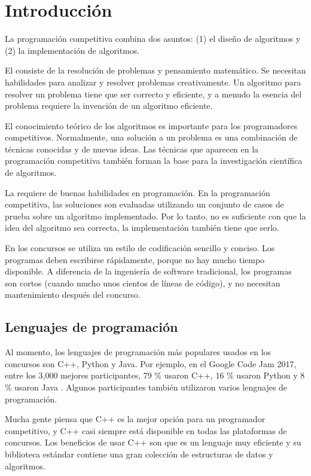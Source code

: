 \chapter{Introducción}

La programación competitiva combina dos asuntos:
(1) el diseño de algoritmos y (2) la implementación de algoritmos.

El  consiste de la resolución de problemas
y pensamiento matemático.
Se necesitan habilidades para analizar y resolver problemas creativamente.
Un algoritmo para resolver un problema
tiene que ser correcto y eficiente,
y a menudo la esencia del problema requiere
la invención de un algoritmo eficiente.

El conocimiento teórico de los algoritmos
es importante para los programadores competitivos.
Normalmente, una solución a un problema es
una combinación de técnicas conocidas y de
nuevas ideas. 
Las técnicas que aparecen en la programación competitiva
también forman la base para la investigación científica
de algoritmos.

La  requiere de buenas
habilidades en programación.
En la programación competitiva, las soluciones
son evaluadas utilizando un conjunto de casos de prueba
sobre un algoritmo implementado.
Por lo tanto, no es suficiente con que la idea del
algoritmo sea correcta, la implementación también
tiene que serlo.

En los concursos se utiliza un estilo de codificación sencillo y conciso.
Los programas deben escribirse rápidamente,
porque no hay mucho tiempo disponible.
A diferencia de la ingeniería de software tradicional,
los programas son cortos (cuando mucho 
unos cientos de líneas de código), y no necesitan
mantenimiento después del concurso.

\section{Lenguajes de programación}


Al momento, los lenguajes de programación más populares
usados en los concursos son C++, Python y Java.
Por ejemplo, en el Google Code Jam 2017,
entre los 3,000 mejores participantes,
79 \% usaron C++,
16 \% usaron Python y
8 \% usaron Java \cite{goo17}.
Algunos participantes también utilizaron varios lenguajes de programación.

Mucha gente piensa que C++ es la mejor opción
para un programador competitivo,
y C++ casi siempre está disponible en todas
las plataformas de concursos.
Los beneficios de usar C++ son que
es un lenguaje muy eficiente y
su biblioteca estándar contiene una
gran colección
de estructuras de datos y algoritmos.

